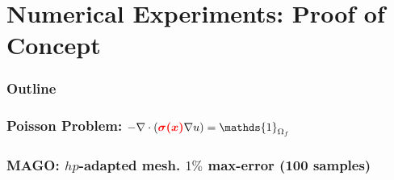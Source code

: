 \documentclass[10pt,aspectratio=169]{beamer}
\begin{document}
\section{Numerical Experiments: Proof of Concept}
\begin{frame}
    \frametitle{Outline}
    \tableofcontents[currentsection]
\end{frame}
\begin{frame}
	\frametitle{Poisson Problem: $-\nabla \cdot ( \tcr{\boldsymbol{\sigma(x)}} \nabla u) = \mathds{1}_{\Omega_{f}}$}
	\begin{figure}[t!]
	\end{figure}
\end{frame}
\begin{frame}
	\frametitle{MAGO: $hp$-adapted mesh. $1\%$ max-error (100 samples)}
\end{frame}
\end{document}
